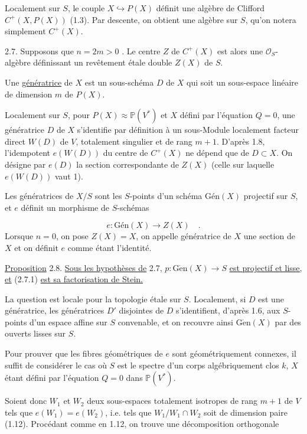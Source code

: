 Localement sur $S$, le couple $X \hookrightarrow P(X)$ définit une algèbre de Clifford $C^+(X, P(X))$ (1.3). Par descente, on obtient une algèbre sur $S$, qu'on notera simplement $C^+(X)$.

2.7. Supposons que $n = 2m > 0$ . Le centre $Z$ de $C^+(X)$ est alors une $\mathcal{O}_S$-algèbre définissant un revêtement étale double $Z(X)$ de $S$.

Une \underline{génératrice} de $X$ est un sous-schéma $D$ de $X$ qui soit un sous-espace linéaire de dimension $m$ de $P(X)$.

Localement sur $S$, pour $P(X) \approx \mathbb{P}(V^*)$ et $X$ défini par l'équation $Q = 0$, une génératrice $D$ de $X$ s'identifie par définition à un sous-Module localement facteur direct $W(D)$ de $V$, totalement singulier et de rang $m + 1$. D'après 1.8, l'idempotent $e(W(D))$ du centre de $C^+(X)$ ne dépend que de $D \subset X$. On désigne par $e(D)$ la section correspondante de $Z(X)$ (celle sur laquelle $e(W(D))$ vaut 1).

Les génératrices de $X/S$ sont les $S$-points d'un schéma $\mbox{Gén}(X)$ projectif sur $S$, et $e$ définit un morphisme de $S$-schémas

\begin{equation}\tag{2.7.1}
e : \mbox{Gén}(X) \longrightarrow Z(X) \quad .
\end{equation}
Lorsque $n = 0$, on pose $Z(X) = X$, on appelle génératrice de $X$ une section de $X$ et on définit $e$ comme étant l'identité.



\underline{Proposition} 2.8. \underline{Sous les hypothèses de} 2.7, $p : \mathrm{G\acute{e}n}(X) \longrightarrow S$ \underline{est projectif et lisse, et} (2.7.1) \underline{est sa factorisation de Stein.}

La question est locale pour la topologie étale sur $S$. Localement, si $D$ est une génératrice, les génératrices $D'$ disjointes de $D$ s'identifient, d'après 1.6, aux $S$-points d'un espace affine sur $S$ convenable, et on recouvre ainsi $\mathrm{G\acute{e}n}(X)$ par des ouverts lisses sur $S$.

Pour prouver que les fibres géométriques de $e$ sont géométriquement connexes, il suffit de considérer le cas où $S$ est le spectre d'un corps algébriquement clos $k$, $X$ étant défini par l'équation $Q = 0$ dans $\mathbb{P}(V^*)$.

Soient donc $W_1$ et $W_2$ deux sous-espaces totalement isotropes de rang $m + 1$ de $V$ tels que $e(W_1) = e(W_2)$, i.e. tels que $W_1/W_1 \cap W_2$ soit de dimension paire (1.12). Procédant comme en 1.12, on trouve une décomposition orthogonale

